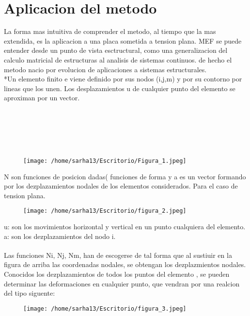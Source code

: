 \documentclass[letter,openright,12pt,spanish]{report}
\begin{document}
\section{Aplicacion del metodo}
La forma mas intuitiva de comprender el metodo, al tiempo que la mas extendida, es la aplicacion a una placa sometida a tension plana. MEF se puede entender desde un punto de vista esctructural, como una generalizacion del calculo matricial de estructuras al analisis de sistemas continuos. de hecho el metodo nacio por evolucion de aplicaciones a sistemas estructurales.\\
*Un elemento finito e viene definido por sus nodos (i,j,m) y por su contorno por lineas que los unen. Los desplazamientos u de cualquier punto del elemento se aproximan por un vector.\\\\\\\\\\\\

\begin{figure}[htp!]
\centering
\texttt{[image: /home/sarha13/Escritorio/Figura\_1.jpeg]}
\caption{}
\label{Figura 2.}
\end{figure}

N son funciones de posicion dadas( funciones de forma y a es un vector formando por los dezplazamientos nodales de los elementos considerados. Para el caso de tension plana.

\begin{figure}[htp!]
\centering
\texttt{[image: /home/sarha13/Escritorio/figura\_2.jpeg]}
\caption{}
\label{Figura 3.}
\end{figure}

u: son los movimientos horizontal y vertical en un punto cualquiera del elemento.\\
a: son los dezplazamientos del nodo i.\\\\

Las funciones Ni, Nj, Nm, han de escogerse de tal forma que al sustiuir en la figura de arriba las coordenadas nodales, se obtengan los dezplazmientos nodales.\\
Conocidos los dezplazamientos de todos los puntos del elemento , se pueden determinar las deformaciones en cualquier punto, que vendran por una realcion del tipo siguente:

\begin{figure}[htp!]
\centering
\texttt{[image: /home/sarha13/Escritorio/figura\_3.jpeg]}
\caption{}
\label{Figura 4.}
\end{figure}
\end{document}
